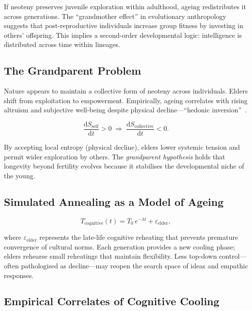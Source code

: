 \documentclass[12pt,a4paper]{article}
\theoremstyle{definition}
\newcommand{\ddt}[1]{\frac{\mathrm{d}#1}{\mathrm{d}t}}
\begin{document}
If neoteny preserves juvenile exploration within adulthood, ageing redistributes
it across generations.  The ``grandmother effect'' in evolutionary anthropology
suggests that post-reproductive individuals increase group fitness by investing
in others' offspring.  This implies a second-order developmental logic:
intelligence is distributed across time within lineages.

\subsection{The Grandparent Problem}

Nature appears to maintain a collective form of neoteny across individuals.
Elders shift from exploitation to empowerment.  Empirically, ageing correlates
with rising altruism and subjective well-being despite physical
decline---``hedonic inversion''~\citep{carstensen2011}.

\begin{equation}
  \ddt{S_{\mathrm{self}}} > 0
  \;\Longrightarrow\;
  \ddt{S_{\mathrm{collective}}} < 0.
\end{equation}

By accepting local entropy (physical decline), elders lower systemic tension
and permit wider exploration by others.  The \emph{grandparent hypothesis}
holds that longevity beyond fertility evolves because it stabilises the
developmental niche of the young.

\subsection{Simulated Annealing as a Model of Ageing}

\begin{equation}
  T_{\mathrm{cognitive}}(t)
  = T_0\,e^{-\lambda t} + \varepsilon_{\mathrm{elder}},
\end{equation}

where $\varepsilon_{\mathrm{elder}}$ represents the late-life cognitive
reheating that prevents premature convergence of cultural norms.  Each
generation provides a new cooling phase; elders rehearse small reheatings
that maintain flexibility.  Less top-down control---often pathologised as
decline---may reopen the search space of ideas and empathic responses.

\subsection{Empirical Correlates of Cognitive Cooling}
\end{document}

